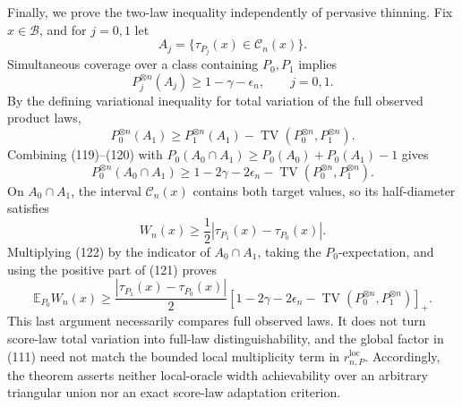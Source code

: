 Finally, we prove the two-law inequality independently of pervasive thinning. Fix \(x\in\mathcal B\), and for \(j=0,1\) let
\[
 A_j=\{\tau_{P_j}(x)\in\mathcal C_n(x)\}.
\]
Simultaneous coverage over a class containing \(P_0,P_1\) implies
\[
 P_j^{\otimes n}(A_j)\ge1-\gamma-\epsilon_n,\qquad j=0,1. \tag{119}
\]
By the defining variational inequality for total variation of the full observed product laws,
\[
 P_0^{\otimes n}(A_1)\ge P_1^{\otimes n}(A_1)
 -\operatorname{TV}(P_0^{\otimes n},P_1^{\otimes n}). \tag{120}
\]
Combining (119)--(120) with \(P_0(A_0\cap A_1)\ge P_0(A_0)+P_0(A_1)-1\) gives
\[
 P_0^{\otimes n}(A_0\cap A_1)\ge
 1-2\gamma-2\epsilon_n-\operatorname{TV}(P_0^{\otimes n},P_1^{\otimes n}). \tag{121}
\]
On \(A_0\cap A_1\), the interval \(\mathcal C_n(x)\) contains both target values, so its half-diameter satisfies
\[
 W_n(x)\ge\frac12|\tau_{P_1}(x)-\tau_{P_0}(x)|. \tag{122}
\]
Multiplying (122) by the indicator of \(A_0\cap A_1\), taking the \(P_0\)-expectation, and using the positive part of (121) proves
\[
 \mathbb E_{P_0}W_n(x)\ge
 \frac{|\tau_{P_1}(x)-\tau_{P_0}(x)|}{2}
 \left[1-2\gamma-2\epsilon_n-\operatorname{TV}(P_0^{\otimes n},P_1^{\otimes n})\right]_+.
\]
This last argument necessarily compares full observed laws. It does not turn score-law total variation into full-law distinguishability, and the global factor in (111) need not match the bounded local multiplicity term in \(r_{n,P}^{\mathrm{loc}}\). Accordingly, the theorem asserts neither local-oracle width achievability over an arbitrary triangular union nor an exact score-law adaptation criterion.
